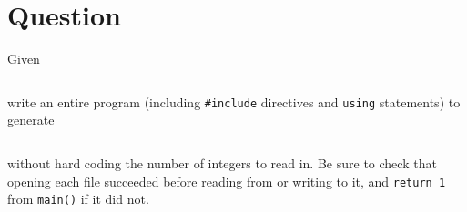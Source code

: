 \newEvenPage

\section{Question}

Given

\inputminted[label={file-io-input.txt}]{text}{\docCodeDir/file-io-input.txt}

write an entire program (including \texttt{#include} directives and
\texttt{using} statements) to generate

\inputminted[label={file-io-output.gen.txt}]{text}{\docCodeDir/file-io-output.gen.txt}

without hard coding the number of integers to read in.  Be sure to check that
opening each file succeeded before reading from or writing to it, and
\texttt{return 1} from \texttt{main()} if it did not.

\newOddPage
\textQuestion{\makePageQuadrilleRuled}

\newpage

